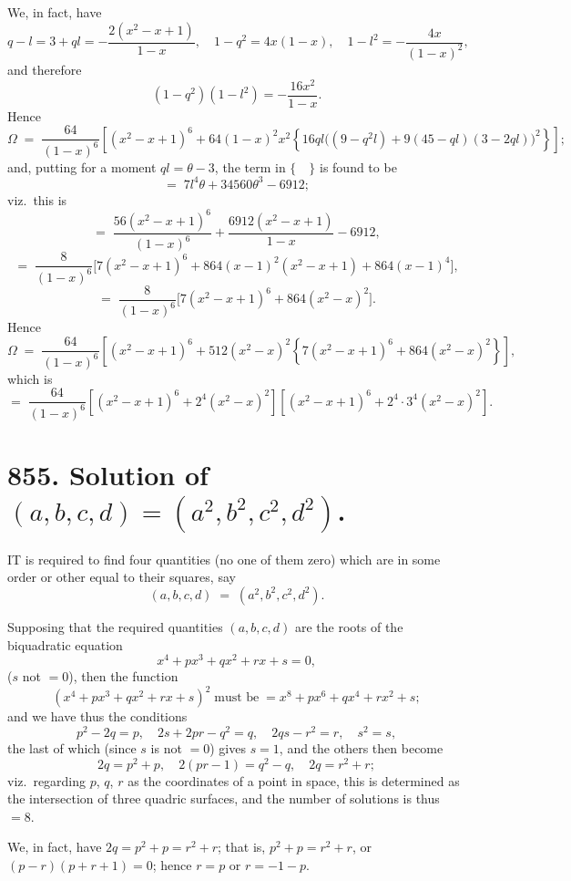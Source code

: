 \documentclass[11pt]{article}
\begin{document}
\medskip

We, in fact, have
\[
q-l = 3 + ql = -\frac{2(x^2-x+1)}{1-x},\quad 1-q^2 = 4x(1-x),\quad 1-l^2 = -\frac{4x}{(1-x)^2},
\]
and therefore
\[
(1-q^2)(1-l^2) = -\frac{16x^2}{1-x}.
\]
Hence
\[
\Omega \;=\; \frac{64}{(1-x)^6}\!\left[(x^2-x+1)^6 + 64(1-x)^2 x^2\!\left\{16ql\bigl((9-q^2 l)+9(45-ql)(3-2ql)\bigr)^2\right\}\right];
\]
and, putting for a moment $ql = \theta-3$, the term in $\{\quad\}$ is found to be
\[
=\; 7l^4\theta + 34560\theta^3 - 6912;
\]
viz.\ this is
\[
=\; \frac{56(x^2-x+1)^6}{(1-x)^6} + \frac{6912(x^2-x+1)}{1-x} - 6912,
\]
\[
=\; \frac{8}{(1-x)^6}\bigl[7(x^2-x+1)^6 + 864(x-1)^2(x^2-x+1) + 864(x-1)^4\bigr],
\]
\[
=\; \frac{8}{(1-x)^6}\bigl[7(x^2-x+1)^6 + 864(x^2-x)^2\bigr].
\]
Hence
\[
\Omega \;=\; \frac{64}{(1-x)^6}\!\left[(x^2-x+1)^6 + 512(x^2-x)^2\!\left\{7(x^2-x+1)^6 + 864(x^2-x)^2\right\}\right],
\]
which is
\[
=\; \frac{64}{(1-x)^6}\!\left[(x^2-x+1)^6 + 2^4(x^2-x)^2\right]\!\left[(x^2-x+1)^6 + 2^4\cdot 3^4(x^2-x)^2\right].
\]

\vfill

\newpage

\section*{855. Solution of $(a, b, c, d) = (a^2, b^2, c^2, d^2)$.}


\medskip

\noindent IT is required to find four quantities (no one of them zero) which are in some order or other equal to their squares, say
\[
(a, b, c, d) \;=\; (a^2, b^2, c^2, d^2).
\]

Supposing that the required quantities $(a, b, c, d)$ are the roots of the biquadratic equation
\[
x^4 + px^3 + qx^2 + rx + s = 0,
\]
($s$ not $=0$), then the function
\[
(x^4 + px^3 + qx^2 + rx + s)^2 \;\text{must be}\;= x^8 + px^6 + qx^4 + rx^2 + s;
\]
and we have thus the conditions
\[
p^2 - 2q = p,\quad 2s + 2pr - q^2 = q,\quad 2qs - r^2 = r,\quad s^2 = s,
\]
the last of which (since $s$ is not $=0$) gives $s=1$, and the others then become
\[
2q = p^2 + p,\quad 2(pr-1) = q^2 - q,\quad 2q = r^2 + r;
\]
viz.\ regarding $p$, $q$, $r$ as the coordinates of a point in space, this is determined as the intersection of three quadric surfaces, and the number of solutions is thus $=8$.

\medskip

We, in fact, have $2q = p^2 + p = r^2 + r$; that is, $p^2 + p = r^2 + r$, or $(p-r)(p+r+1) = 0$; hence $r=p$ or $r = -1-p$.
\end{document}
